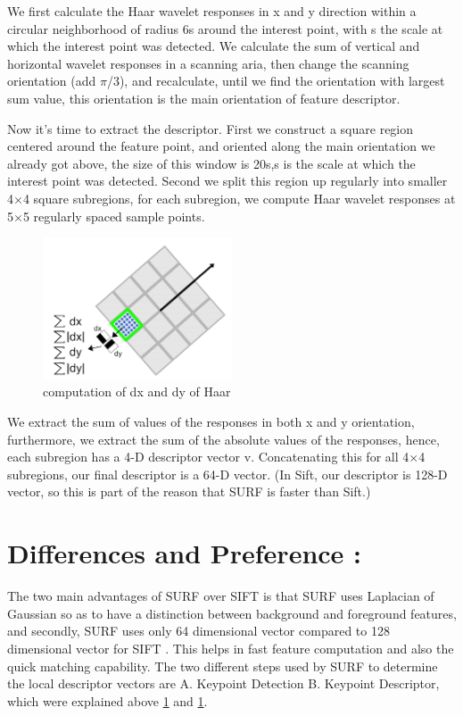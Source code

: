 We first calculate the Haar wavelet responses in x and y direction within a circular neighborhood of radius 6s around the interest point, with s the scale at which the interest point was detected. We calculate the sum of vertical and horizontal wavelet responses in a scanning aria, then change the scanning orientation (add $\pi$/3), and recalculate, until we find the orientation with largest sum value, this orientation is the main orientation of feature descriptor.

Now it’s time to extract the descriptor. First we construct a square region centered around the feature point, and oriented along the main orientation we already got above, the size of this window is 20s,s is the scale at which the interest point was detected. Second we split this region up regularly into smaller 4$\times$4 square subregions, for each subregion, we compute Haar wavelet responses at 5$\times$5 regularly spaced sample points.


\begin{figure}[H]
\centering
\includegraphics[width=0.5\textwidth]{img/surf5.png}
\caption{computation of dx and dy of Haar  }
\label{fig:surf5}
\end{figure}

We extract the sum of values of the responses in both x and y orientation, furthermore, we extract the sum of the absolute values of the responses, hence, each subregion has a 4-D descriptor vector v. Concatenating this for all 4$\times$4 subregions, our final descriptor is a 64-D vector. (In Sift, our descriptor is 128-D vector, so this is part of the reason that SURF is faster than Sift.)\\


\section{Differences and Preference :}
The two main advantages of SURF over SIFT is that SURF uses Laplacian of Gaussian so as to have a distinction
between background and foreground features, and secondly, SURF uses only 64 dimensional vector compared to 128 dimensional vector for SIFT . This helps in fast feature computation and also the quick matching capability.
The two different steps used by SURF to determine the local descriptor vectors are A. Keypoint Detection B. Keypoint Descriptor, which were  explained above \ref{} and \ref{}.

